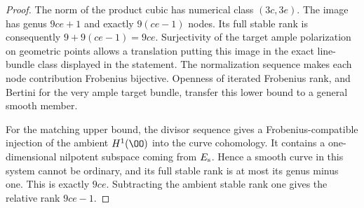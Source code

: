 \begin{proof}
The norm of the product cubic has numerical class $(3c,3e)$.
The image has genus $9ce+1$ and exactly $9(ce-1)$ nodes.
Its full stable rank is consequently $9+9(ce-1)=9ce$.
Surjectivity of the target ample polarization on geometric points
allows a translation putting this image in the exact line-bundle
class displayed in the statement.
The normalization sequence makes each node contribution
Frobenius bijective.  Openness of iterated Frobenius rank, and
Bertini for the very ample target bundle, transfer this lower bound
to a general smooth member.

For the matching upper bound, the divisor sequence gives a
Frobenius-compatible injection of the ambient $H^1(\OO)$ into the
curve cohomology.  It contains a one-dimensional nilpotent subspace
coming from $E_{\rm s}$.  Hence a smooth curve in this system cannot
be ordinary, and its full stable rank is at most its genus minus one.
This is exactly $9ce$.  Subtracting the ambient stable rank one
gives the relative rank $9ce-1$.
\end{proof}


